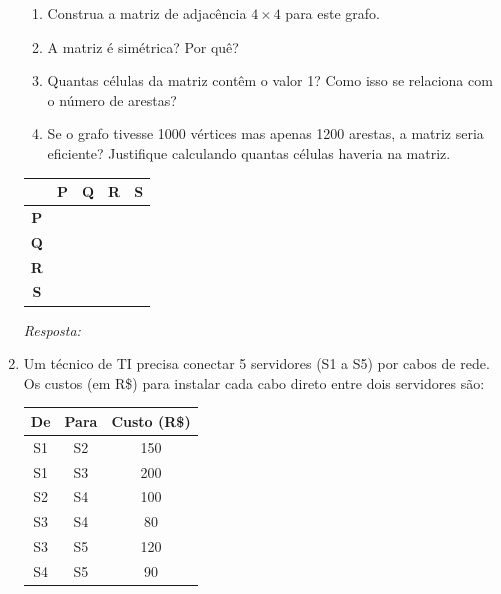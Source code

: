 \documentclass[12pt]{article}
\newcommand{\quadro}[1]{\vspace{0.2cm}\begin{tcolorbox}[colback=white, colframe=black, height=#1, boxrule=0.5pt, arc=0pt] \textit{Resposta:} \end{tcolorbox}}
\begin{document}
\begin{enumerate}[label=\arabic*), leftmargin=1.5cm, itemsep=0.8cm]
\begin{enumerate}[label=\alph*)]
    \item Construa a matriz de adjacência $4 \times 4$ para este grafo.
    \item A matriz é simétrica? Por quê?
    \item Quantas células da matriz contêm o valor 1? Como isso se relaciona com o número de arestas?
    \item Se o grafo tivesse 1000 vértices mas apenas 1200 arestas, a matriz seria eficiente? Justifique calculando quantas células haveria na matriz.
\end{enumerate}

\begin{center}
    \begin{tcolorbox}[colback=white, colframe=black, width=0.5\textwidth, boxrule=0.5pt, arc=0pt]
    \renewcommand{\arraystretch}{1.8}
    \begin{tabular}{c|cccc}
        & \textbf{P} & \textbf{Q} & \textbf{R} & \textbf{S} \\ \hline
        \textbf{P} & & & & \\ \hline
        \textbf{Q} & & & & \\ \hline
        \textbf{R} & & & & \\ \hline
        \textbf{S} & & & & \\
    \end{tabular}
    \end{tcolorbox}
\end{center}
\quadro{6cm}

\item Um técnico de TI precisa conectar 5 servidores (S1 a S5) por cabos de rede. Os custos (em R\$) para instalar cada cabo direto entre dois servidores são:

\begin{center}
    \begin{tabular}{|c|c|c|}
        \hline
        \textbf{De} & \textbf{Para} & \textbf{Custo (R\$)} \\ \hline
        S1 & S2 & 150 \\ \hline
        S1 & S3 & 200 \\ \hline
        S2 & S4 & 100 \\ \hline
        S3 & S4 & 80  \\ \hline
        S3 & S5 & 120 \\ \hline
        S4 & S5 & 90  \\ \hline
    \end{tabular}
\end{center}


\end{enumerate}
\end{document}

